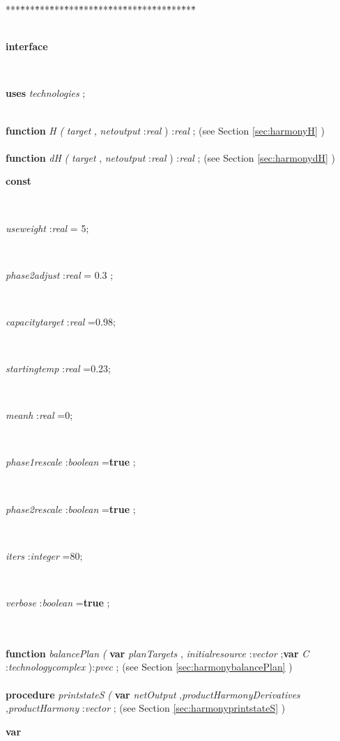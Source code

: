 \begin{tabbing}
***\=***\=***\=***\=***\=***\=***\=***\=***\=***\=***\=***\=***\=\kill
\\
\\
\+\parbox{14cm}{\textsf{\textbf{interface} }}\\
\+\parbox{14cm}{\textsf{\textbf{uses}  \textit{technologies} ;}}\\
\<\textsf{\textbf{function}  \textit{H} \textit{(}  \textit{target} ,  \textit{netoutput} :\textit{real} ) :\textit{real} ;} (see Section \ref{sec:harmonyH} )\\
\\
\<\textsf{\textbf{function}  \textit{dH} \textit{(} \textit{target} ,  \textit{netoutput} :\textit{real} ) :\textit{real} ;} (see Section \ref{sec:harmonydH} )\\
\<\parbox{14cm}{\textsf{\textbf{const} }}\\
\parbox{14cm}{\textsf{\textit{useweight} :\textit{real}  = 5;}}\\
\parbox{14cm}{\textsf{\textit{phase2adjust} :\textit{real}  = 0.3 ;}}\\
\parbox{14cm}{\textsf{\textit{capacitytarget} :\textit{real} =0.98;}}\\
\parbox{14cm}{\textsf{\textit{startingtemp} :\textit{real} =0.23;}}\\
\parbox{14cm}{\textsf{\textit{meanh} :\textit{real} =0;}}\\
\parbox{14cm}{\textsf{\textit{phase1rescale} :\textit{boolean} =\textbf{true} ;}}\\
\parbox{14cm}{\textsf{\textit{phase2rescale} :\textit{boolean} =\textbf{true} ;}}\\
\parbox{14cm}{\textsf{\textit{iters} :\textit{integer} =80;}}\\
\parbox{14cm}{\textsf{\textit{verbose} :\textit{boolean} =\textbf{true} ;}}\\
\\
\<\textsf{\textbf{function}  \textit{balancePlan} \textit{(}   \textbf{var}   \textit{planTargets} , \textit{initialresource} :\textit{vector} ;\textbf{var}  \textit{C} :\textit{technologycomplex}  ):\textit{pvec} ;} (see Section \ref{sec:harmonybalancePlan} )\\
\\
\<\textsf{\textbf{procedure}  \textit{printstateS} \textit{(} \textbf{var}  \textit{netOutput} ,\textit{productHarmonyDerivatives} ,\textit{productHarmony} :\textit{vector} ;} (see Section \ref{sec:harmonyprintstateS} )\\
\<\parbox{14cm}{\textsf{\textbf{var} }}\\

\end{tabbing}
